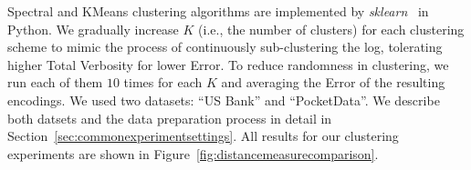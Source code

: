 
Spectral and KMeans clustering algorithms are implemented by \textit{sklearn}~\cite{scikit-learn} in Python. 
We gradually increase $K$ (i.e., the number of clusters) for each clustering scheme to mimic the process of continuously sub-clustering the log, tolerating higher Total Verbosity for lower Error.
To reduce randomness in clustering, we run each of them $10$ times for each $K$ and averaging the Error of the resulting encodings.  
We used two datasets: ``US Bank'' and ``PocketData''.  
We describe both datsets and the data preparation process in detail in Section~\ref{sec:commonexperimentsettings}. 
All results for our clustering experiments are shown in Figure~\ref{fig:distancemeasurecomparison}.

